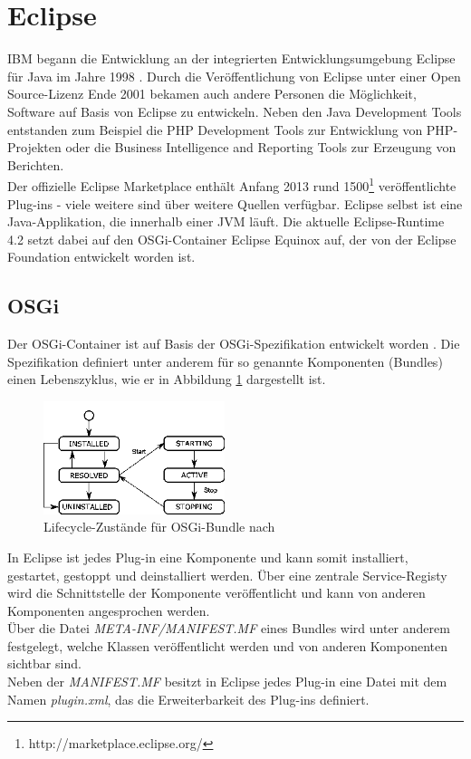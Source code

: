 \documentclass[a4paper,12pt]{scrreprt}
\begin{document}
\section{Eclipse}
IBM begann die Entwicklung an der integrierten Entwicklungsumgebung Eclipse für Java im Jahre 1998 \cite{historyEclipse}. Durch die Veröffentlichung von Eclipse unter einer Open Source-Lizenz Ende 2001 bekamen auch andere Personen die Möglichkeit, Software auf Basis von Eclipse zu entwickeln. 
Neben den Java Development Tools entstanden zum Beispiel die PHP Development Tools zur Entwicklung von PHP-Projekten oder die Business Intelligence and Reporting Tools zur Erzeugung von Berichten.\\
Der offizielle Eclipse Marketplace enthält Anfang 2013 rund 1500\footnote{http://marketplace.eclipse.org/} ver\-öf\-fent\-lichte Plug-ins - viele weitere sind über weitere Quellen verfügbar.
Eclipse selbst ist eine Java-Applikation, die innerhalb einer JVM läuft.
Die aktuelle Eclipse-Runtime 4.2 setzt dabei auf den OSGi-Container Eclipse Equinox auf, der von der Eclipse Foundation entwickelt worden ist.
\subsection{OSGi}
Der OSGi-Container ist auf Basis der OSGi-Spezifikation entwickelt worden \cite{osgiSpec}. Die Spezifikation definiert unter anderem für so genannte Komponenten (Bundles) einen Lebenszyklus, wie er in Abbildung \ref{fig:bundlelifecycle} dargestellt ist. 
\begin{figure}[h]
	\centering
		\includegraphics[width=200px]{img/bundlelifecycle.png}
		\caption{Lifecycle-Zustände für OSGi-Bundle nach \cite{osgiLifecycle}}
		\label{fig:bundlelifecycle}
\end{figure}

In Eclipse ist jedes Plug-in eine Komponente und kann somit installiert, gestartet, gestoppt und deinstalliert werden. Über eine zentrale Service-Registy wird die Schnittstelle der Komponente veröffentlicht und kann von anderen Komponenten angesprochen werden.\\
Über die Datei \textit{META-INF/MANIFEST.MF} eines Bundles wird unter anderem festgelegt, welche Klassen veröffentlicht werden und von anderen Komponenten sichtbar sind.\\
Neben der \textit{MANIFEST.MF} besitzt in Eclipse jedes Plug-in eine Datei mit dem Namen \textit{plugin.xml}, das die Erweiterbarkeit des Plug-ins definiert.
\end{document}
